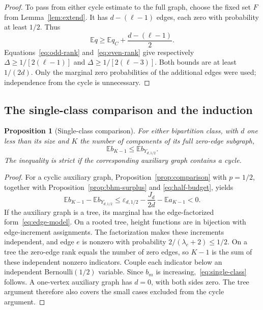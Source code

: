 \documentclass[11pt,reqno]{amsart}
\newtheorem{proposition}[theorem]{Proposition}
\theoremstyle{remark}
\numberwithin{equation}{section}
\newcommand{\E}{\mathbb E}
\begin{document}
\begin{proof}
To pass from either cycle estimate to the full graph, choose the fixed
set $F$ from Lemma~\ref{lem:extend}.
It has $d-(\ell-1)$ edges, each zero with probability at least $1/2$.
Thus
\[
 \E q\ge\E q_C+\frac{d-(\ell-1)}2.
\]
Equations~\eqref{eq:odd-rank} and~\eqref{eq:even-rank} give respectively
$\Delta\ge1/[2(\ell-1)]$ and $\Delta\ge1/[2(\ell-3)]$.
Both bounds are at least $1/(2d)$. Only the marginal zero probabilities
of the additional edges were used; independence from the cycle is
unnecessary.
\end{proof}

\subsection{The single-class comparison and the induction}

\begin{proposition}[Single-class comparison]\label{prop:single-class}
For either bipartition class, with $d$ one less than its size and $K$
the number of components of its full zero-edge subgraph,
\begin{equation}\label{eq:single-class}
 \E b_{K-1}\le\E b_{Y_{d,1/2}}.
\end{equation}
The inequality is strict if the corresponding auxiliary graph contains
a cycle.
\end{proposition}

\begin{proof}
For a cyclic auxiliary graph, Proposition~\ref{prop:comparison} with
$p=1/2$, together with Proposition~\ref{prop:bhm-surplus} and
\eqref{eq:half-budget}, yields
\[
 \E b_{K-1}-\E b_{Y_{d,1/2}}
 \le\varepsilon_{d,1/2}-\frac{J_d}{2d}-\E a_{K-1}<0.
\]
If the auxiliary graph is a tree, its marginal has the edge-factorized
form~\eqref{eq:edge-model}. On a rooted tree, height functions are in
bijection with edge-increment assignments. The factorization makes
these increments independent,
and edge $e$ is nonzero with probability
$2/(\lambda_e+2)\le1/2$. On a tree the zero-edge rank equals the number
of zero edges, so $K-1$ is the sum of these independent nonzero indicators.
Couple each indicator below an independent Bernoulli$(1/2)$ variable.
Since $b_m$ is increasing,~\eqref{eq:single-class} follows. A one-vertex
auxiliary graph has $d=0$, with both sides zero. The tree argument
therefore also covers the small cases excluded from the cycle argument.
\end{proof}
\end{document}
